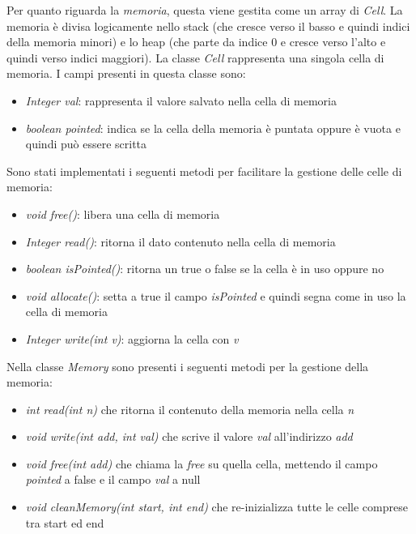 \documentclass[../../main]{subfiles}
\begin{document}
Per quanto riguarda la \emph{memoria}, questa viene gestita come un array di \emph{Cell}. La memoria è divisa logicamente nello stack (che cresce verso il basso e quindi indici della memoria minori) e lo heap (che parte da indice 0 e cresce verso l'alto e quindi verso indici maggiori).
\newline
La classe \emph{Cell} rappresenta una singola cella di memoria. I campi presenti in questa classe sono:
\begin{itemize}
    \item \emph{Integer val}: rappresenta il valore salvato nella cella di memoria
    \item \emph{boolean pointed}: indica se la cella della memoria è puntata oppure è vuota e quindi può essere scritta
\end{itemize}
Sono stati implementati i seguenti metodi per facilitare la gestione delle celle di memoria: 
\begin{itemize}
    \item \emph{void free()}: libera una cella di memoria
    \item \emph{Integer read()}: ritorna il dato contenuto nella cella di memoria
    \item \emph{boolean isPointed()}: ritorna un true o false se la cella è in uso oppure no
    \item \emph{void allocate()}: setta a true il campo \emph{isPointed} e quindi segna come in uso la cella di memoria
    \item \emph{Integer write(int v)}: aggiorna la cella con \emph{v}
\end{itemize}
Nella classe \emph{Memory} sono presenti i seguenti metodi per la gestione della memoria: 
\begin{itemize}
    \item \emph{int read(int n)} che ritorna il contenuto della memoria nella cella \emph{n}
    \item \emph{void write(int add, int val)} che scrive il valore \emph{val} all'indirizzo \emph{add}
    \item \emph{void free(int add)} che chiama la \emph{free} su quella cella, mettendo il campo \emph{pointed} a false e il campo \emph{val} a null
    \item \emph{void cleanMemory(int start, int end)} che re-inizializza tutte le celle comprese tra start ed end
\end{itemize}
\end{document}
